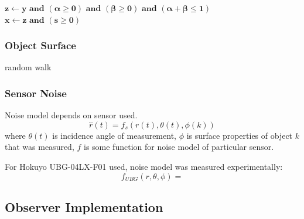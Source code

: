 \begin{algorithm}
{			
		$\mathbf{z} \longleftarrow \mathbf{y} \textbf{ and } (\bm{\alpha} \geq \mathbf{0}) 
		\textbf{ and } (\bm{\beta} \geq \mathbf{0}) \textbf{ and } (\bm{\alpha}+\bm{\beta} \leq 
		\mathbf{1})$\\
		$\mathbf{x} \longleftarrow \mathbf{z} \textbf{ and } (\mathbf{s} \geq \mathbf{0})$\\
	}
	\caption{M{\"o}ller-Trumbore ray-triangle intersection} \label{intersectionalgorithm}
	\end{algorithm}
	
	\subsubsection{Object Surface}
	random walk
	
	\subsubsection{Sensor Noise}
	Noise model depends on sensor used.
	\begin{equation}
		\hat{r}(t) = f_s(r(t),\theta(t),\phi(k))
	\end{equation}
	where $\theta(t)$ is incidence angle of measurement, $\phi$ is surface properties of object $k$ that was measured, $f$ is some function for noise model of particular sensor.
	
	For Hokuyo UBG-04LX-F01 used, noise model was measured experimentally:
	\begin{equation}
		f_{UBG}(r,\theta,\phi) = 
	\end{equation}
	
	
\subsection{Observer Implementation}
